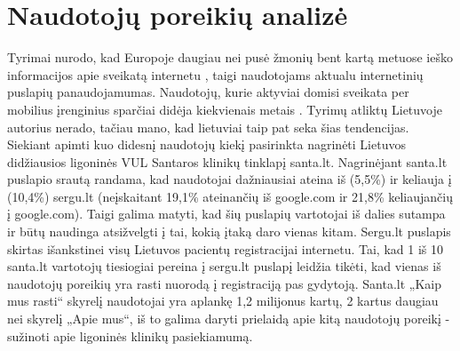 \documentclass{VUMIFPSbakalaurinis}
\begin{document}
\section{Naudotojų poreikių analizė}
Tyrimai nurodo, kad Europoje daugiau nei pusė žmonių bent kartą metuose ieško informacijos apie sveikatą internetu \cite{EuCitizDigHealthEn}, taigi naudotojams aktualu internetinių puslapių panaudojamumas. Naudotojų, kurie aktyviai domisi sveikata per mobilius įrenginius sparčiai didėja kiekvienais metais \cite{EmergingmHealthEn}. Tyrimų atliktų Lietuvoje autorius nerado, tačiau mano, kad lietuviai taip pat seka šias tendencijas. Siekiant apimti kuo didesnį naudotojų kiekį pasirinkta nagrinėti Lietuvos didžiausios ligoninės VUL Santaros klinikų tinklapį santa.lt. Nagrinėjant santa.lt puslapio srautą randama, kad naudotojai dažniausiai ateina iš (5,5\%) ir keliauja į (10,4\%) sergu.lt (neįskaitant 19,1\% ateinančių iš google.com ir 21,8\% keliaujančių į google.com)\cite{AlexaSantaEn}. Taigi galima matyti, kad šių puslapių vartotojai iš dalies sutampa ir būtų naudinga atsižvelgti į tai, kokią įtaką daro vienas kitam. Sergu.lt puslapis skirtas išankstinei visų Lietuvos pacientų registracijai internetu. Tai, kad 1 iš 10 santa.lt vartotojų tiesiogiai pereina į sergu.lt puslapį leidžia tikėti, kad vienas iš naudotojų poreikių yra rasti nuorodą į registraciją pas gydytoją. Santa.lt „Kaip mus rasti“ skyrelį naudotojai yra aplankę 1,2 milijonus kartų\cite{VulSkKaipMusRastiLt}, 2 kartus daugiau nei skyrelį „Apie mus“\cite{VulSkApieMusLt}, iš to galima daryti prielaidą apie kitą naudotojų poreikį - sužinoti apie ligoninės klinikų pasiekiamumą.


\end{document}
